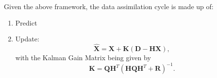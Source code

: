 Given the above framework, the data assimilation cycle is made up of:
\begin{enumerate}
    \item Predict
    \item Update:
    \begin{equation}
        \hat{\mathbf{X}} = \mathbf{X} + \mathbf{K}
                           \left(
                           \mathbf{D} - \mathbf{H} \mathbf{X}
                           \right),
    \end{equation}
    with the Kalman Gain Matrix being given by
    \begin{equation}
        \mathbf{K} = \mathbf{Q} \mathbf{H}^T
                     {\left(
                     \mathbf{H} \mathbf{Q} \mathbf{H}^T
                     + \mathbf{R}
                     \right)} ^ {-1}.
    \end{equation}
\end{enumerate}



